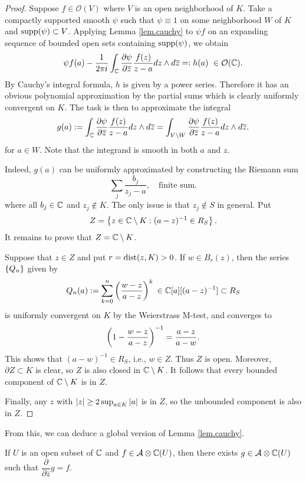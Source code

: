 \documentclass{article}
\begin{document}
\begin{proof}
    Suppose $f\in\mathcal{O}(V)$ where $V$ is an open neighborhood of $K$. Take a compactly supported smooth $\psi$ such that $\psi\equiv 1$ on some neighborhood $W$ of $K$ and $\operatorname{supp}(\psi)\subset V$. Applying Lemma \ref{lem.cauchy} to $\psi f$ on an expanding sequence of bounded open sets containing $\operatorname{supp}(\psi)$, we obtain
    \[
        \psi f(a) - \frac{1}{2\pi i} \int_{\mathbb{C}} \frac{\partial\psi}{\partial\overline{z}} \frac{f(z)}{z-a} dz\wedge d\overline{z} =: h(a) \ \in \mathcal{O}(\mathbb{C}).
    \]
    By Cauchy's integral formula, $h$ is given by a power series. Therefore it has an obvious polynomial approximation by the partial sums which is clearly uniformly convergent on $K$. The task is then to approximate the integral
    \[
        g(a)
        := \int_{\mathbb{C}} \frac{\partial\psi}{\partial\overline{z}} \frac{f(z)}{z-a} dz\wedge d\overline{z}
        = \int_{V\setminus W} \frac{\partial\psi}{\partial\overline{z}} \frac{f(z)}{z-a} dz\wedge d\overline{z}.
    \]
    for $a\in W$. Note that the integrand is smooth in both $a$ and $z$. 
    
    Indeed, $g(a)$ can be uniformly approximated by constructing the Riemann sum
    \[
        \sum_{j} \frac{b_j}{z_j-a},\quad\text{finite sum}.
    \]
    where all $b_j\in\mathbb{C}$ and $z_j\notin K$. The only issue is that $z_j\notin S$ in general. Put
    \[
        Z = \left\{z\in\mathbb{C}\setminus K:(a-z)^{-1}\in R_S\right\}.
    \]
    It remains to prove that $Z=\mathbb{C}\setminus K$.

    Suppose that $z\in Z$ and put $r=\operatorname{dist}(z,K)>0$. If $w\in B_r(z)$, then the series $\left\{Q_n\right\}$ given by
    \[
        Q_n(a) := \sum_{k=0}^{n} \left(\frac{w-z}{a-z}\right)^k \:\in\mathbb{C}[a][(a-z)^{-1}] \subset R_S
    \]
    is uniformly convergent on $K$ by the Weierstrass M-test, and converges to
    \[
        \left(1-\frac{w-z}{a-z}\right)^{-1} = \frac{a-z}{a-w}.
    \]
    This shows that $(a-w)^{-1}\in R_S$, i.e., $w\in Z$. Thus $Z$ is open. Moreover, $\partial Z\subset K$ is clear, so $Z$ is also closed in $\mathbb{C}\setminus K$. It follows that every bounded component of $\mathbb{C}\setminus K$ is in $Z$.

    Finally, any $z$ with $\left\vert z\right\vert\geq 2\sup_{a\in K}\left\vert a\right\vert$ is in $Z$, so the unbounded component is also in $Z$.
\end{proof}

From this, we can deduce a global version of Lemma \ref{lem.cauchy}.
\begin{proposition}
    If $U$ is an open subset of $\mathbb{C}$ and $f\in\mathcal{A}\otimes\mathbb{C}(U)$, then there exists $g\in\mathcal{A}\otimes\mathbb{C}(U)$ such that $\dfrac{\partial}{\partial\overline{z}}g=f$.
\end{proposition}
\end{document}
